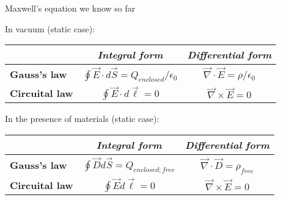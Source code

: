 %
%
%

\begin{frame}{Maxwell's equation we know so far}

In vacuum (static case):

\begin{center}
 {
  \begin{table}[H]
    \begin{tabular}{|l|c|c|}
      \hline
          & {\it Integral form} & {\it Differential form} \\
      \hline
      {\bf Gauss's law} &
        $\oint \vec{E} \cdot d\vec{S} = Q_{enclosed} / \epsilon_0$ &
        $\vec{\nabla} \cdot \vec{E} = \rho / \epsilon_0$ \\

      {\bf Circuital law} &
        $\oint \vec{E} \cdot d\vec{\ell} = 0$ &
        $\vec{\nabla} \times \vec{E} = 0$ \\
      \hline
    \end{tabular}
  \end{table}
 }
\end{center}

In the presence of materials (static case):

\begin{center}
 {
  \begin{table}[H]
    \begin{tabular}{|l|c|c|}
      \hline
          & {\it Integral form} & {\it Differential form} \\
      \hline
      {\bf Gauss's law} &
        $\oint \vec{D} d\vec{S} = Q_{enclosed; free}$ &
        $\vec{\nabla} \cdot \vec{D} = \rho_{free}$ \\

      {\bf Circuital law} &
        $\oint \vec{E} d\vec{\ell} = 0$ &
        $\vec{\nabla} \times \vec{E} = 0$ \\
      \hline
    \end{tabular}
  \end{table}
 }
\end{center}

\end{frame}
